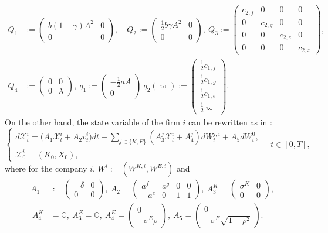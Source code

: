 \documentclass[10pt,a4paper]{amsart}
\numberwithin{equation}{section}
\newcommand{\w}{\varpi}
\begin{document}
\begin{align*}
Q_1&:= 
\begin{pmatrix} 
b(1-\gamma) A^2 & 0 \\
0&0
\end{pmatrix},
\quad {Q}_2 :=
\begin{pmatrix} 
\frac{1}{2}b\gamma A^2 &0\\
0&0
\end{pmatrix},
\  Q_3:= 
\begin{pmatrix} 
c_{2,f} 	&0			&0			&0\\
0		&c_{2,g} 		&0			&0\\
0		&0			&c_{2,e}		&0\\
0		&0			&0			&c_{2,x}
\end{pmatrix},
\\
Q_4&:=
\begin{pmatrix}
 0&0\\
 0&\lambda
 \end{pmatrix} ,\ 
q_1 := 
\begin{pmatrix} 
-\frac{1}{2}aA \\
0
\end{pmatrix}
\  q_2(\w) := 
\begin{pmatrix}
\frac{1}{2}c_{1,f}\\
\frac{1}{2}c_{1,g}\\
\frac{1}{2}c_{1,e}\\
\frac{1}{2}\w
\end{pmatrix}.
\end{align*}
On the other hand, the state variable of the firm $i$ can be rewritten as in \cite{del2024mean}:
\begin{equation}
\label{eqn: state variable N}
\begin{cases}
d\mathcal{X}^i_t = \big( A_1 \mathcal{X}^i_t + A_2 v^i_t\big) dt + \sum_{j \in\{ K,E\}} (A^j_3\mathcal{X}^i_t+ A^j_4)dW^{j,i}_t + A_5dW^0_t,\\
\mathcal{X}^i_0 = (K_0,X_0),
\end{cases}\quad t\in[0,T],
\end{equation}
where for the company $i$, $W^i := (W^{K,i}, W^{E,i})$ and
\begin{align*}
A_1 &:= 
\begin{pmatrix}
-\delta	&0	\\
0		&0	
\end{pmatrix},
\ 
A_2 = 
\begin{pmatrix} 
a^f	&a^g		&0	&0\\
-a^e	&0		&1	&1
\end{pmatrix},
\ A^K_3=
\begin{pmatrix} 
\sigma^K	&0	\\
0		&0
\end{pmatrix},\\
\ A^K_4 &= \mathds{O},
\ A^E_3 = \mathds{O}, \  A^E_4 = \begin{pmatrix}
0\\
-\sigma^E\rho
\end{pmatrix},\
A_5 = \begin{pmatrix}
0\\
-\sigma^E\sqrt{1-\rho^2}
\end{pmatrix}.
\end{align*}
\end{document}
